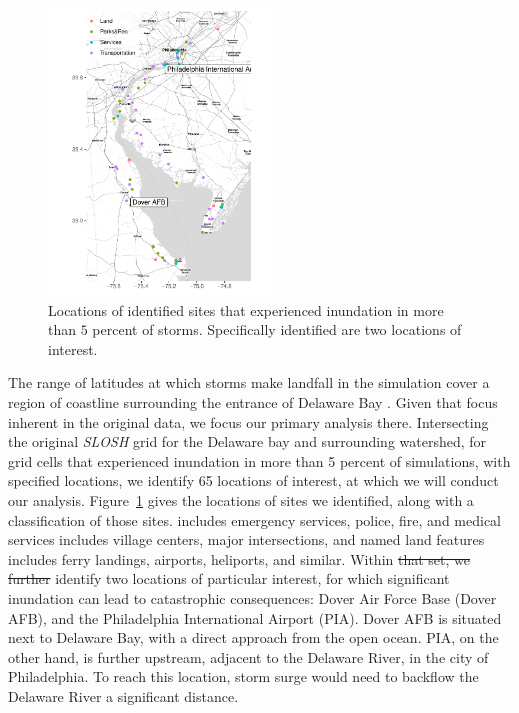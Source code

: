 \begin{figure}[ht]
    \caption{Locations of identified sites that experienced inundation in more than 
        $5$ percent of storms.  Specifically identified are two locations of 
        interest.  \label{map:delawarebay}}
    \centering
    \includegraphics[height=3in]{./plots/delaware}
\end{figure}

The range of latitudes at which storms make landfall in the simulation cover a region of
    coastline surrounding the entrance of Delaware Bay .  Given that focus inherent in the original data, we focus our primary analysis there.
    Intersecting the original \emph{SLOSH} grid for the Delaware bay and surrounding watershed, 
    for grid cells that experienced inundation in more than 5 percent of simulations, 
    with specified locations, we identify 65 locations of interest, at which we will conduct 
    our analysis.  Figure~\ref{map:delawarebay} gives the locations of sites we identified, along
    with a classification of those sites.  
    includes emergency services, police, fire, and medical services
    includes village centers, major intersections, and named land features  includes ferry landings, airports, heliports, and similar.
    Within \st{that set, we further}  identify two 
    locations of particular interest,  for which significant inundation can lead to 
    catastrophic consequences:   Dover Air Force Base (Dover AFB), and the Philadelphia International 
    Airport (PIA). Dover AFB is situated next to Delaware Bay, with a direct approach from the
    open ocean.  PIA, on the other hand, is further upstream, adjacent to the Delaware River, 
    in the city of Philadelphia.  To reach this location, storm surge would need to backflow 
    the Delaware River a significant distance.

